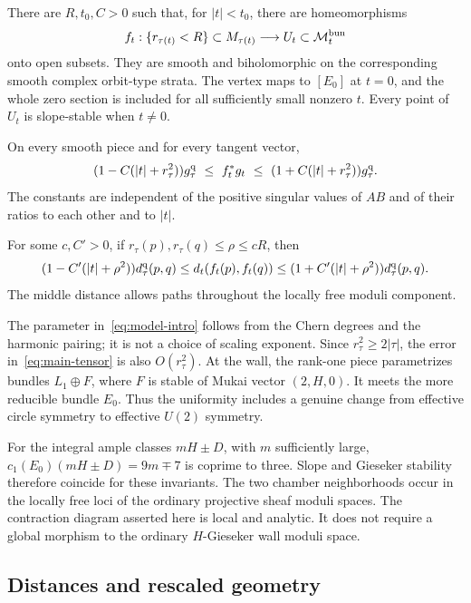 \begin{theorem}\label{thm:main}
There are $R,t_0,C>0$ such that, for $|t|<t_0$, there are
homeomorphisms
\[
f_t:\{r_{\tau(t)}<R\}\subset M_{\tau(t)}
\longrightarrow U_t\subset\mathcal M_t^{\rm bun}
\]
onto open subsets. They are smooth and biholomorphic on the corresponding
smooth complex orbit-type strata. The vertex maps to $[E_0]$ at
$t=0$, and the whole zero section is included for all sufficiently small
nonzero $t$. Every point of $U_t$ is slope-stable when $t\ne0$.

On every smooth piece and for every tangent vector,
\begin{equation}\label{eq:main-tensor}
(1-C(|t|+r_\tau^2))g_\tau^{\rm q}
\ \le\ f_t^*g_t\ \le\
(1+C(|t|+r_\tau^2))g_\tau^{\rm q}.
\end{equation}
The constants are independent of the positive singular values of $AB$
and of their ratios to each other and to $|t|$.

For some $c,C'>0$, if $r_\tau(p),r_\tau(q)\le\rho\le cR$, then
\begin{equation}\label{eq:main-distance}
(1-C'(|t|+\rho^2))d_\tau^{\rm q}(p,q)
\le d_t(f_t(p),f_t(q))
\le(1+C'(|t|+\rho^2))d_\tau^{\rm q}(p,q).
\end{equation}
The middle distance allows paths throughout the locally free moduli
component.
\end{theorem}

The parameter in~\eqref{eq:model-intro} follows from the Chern degrees and
the harmonic pairing; it is not a choice of scaling exponent. Since
$r_\tau^2\ge2|\tau|$, the error in~\eqref{eq:main-tensor} is also $O(r_\tau^2)$.
At the wall, the rank-one piece parametrizes bundles $L_1\oplus F$, where
$F$ is stable of Mukai vector $(2,H,0)$. It meets the more reducible
bundle $E_0$. Thus the uniformity includes a genuine change from effective
circle symmetry to effective $U(2)$ symmetry.

For the integral ample classes $mH\pm D$, with $m$ sufficiently large,
$c_1(E_0)(mH\pm D)=9m\mp7$ is coprime to three. Slope and Gieseker
stability therefore coincide for these invariants. The two chamber
neighborhoods occur in the locally free loci of the ordinary projective
sheaf moduli spaces. The contraction diagram asserted here is local
and analytic. It does not require a global morphism to the ordinary
$H$-Gieseker wall moduli space.

\subsection{Distances and rescaled geometry}

